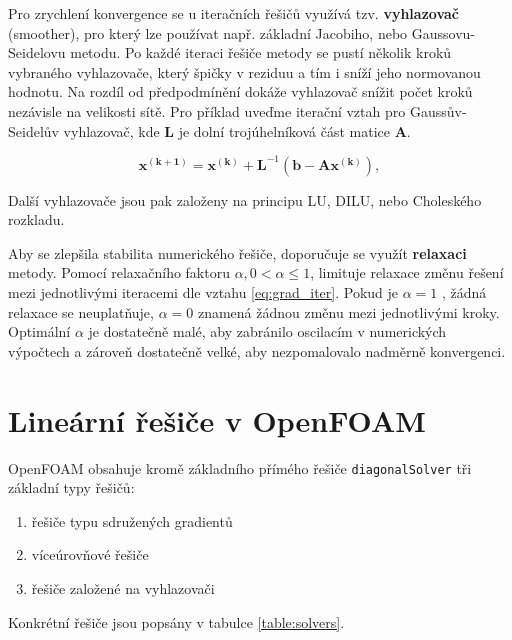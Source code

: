 \documentclass[a4paper,12pt]{report}
\theoremstyle{remark}
\begin{document}
	Pro zrychlení konvergence se u iteračních řešičů využívá tzv. \textbf{vyhlazovač} (smoother), pro který lze používat např. základní Jacobiho, nebo Gaussovu-Seidelovu metodu. Po každé iteraci řešiče metody se pustí několik kroků vybraného vyhlazovače, který  špičky v reziduu a tím i sníží jeho normovanou hodnotu. Na rozdíl od předpodmínění dokáže vyhlazovač snížit počet kroků nezávisle na velikosti sítě. Pro příklad uveďme iterační vztah pro Gaussův-Seidelův vyhlazovač, kde $\boldsymbol{L}$ je dolní trojúhelníková část matice $\boldsymbol{A}$.
	
	\begin{equation}
		\boldsymbol{x^{(k+1)}} = \boldsymbol{x^{(k)}}+\boldsymbol{L}^{-1}(\boldsymbol{b} -  \boldsymbol{A}\boldsymbol{x^{(k)}}),
		\label{eq:gs_smoother}
	\end{equation}

Další vyhlazovače jsou pak založeny na principu LU, DILU, nebo Choleského rozkladu.
	
	Aby se zlepšila stabilita numerického řešiče, doporučuje se využít \textbf{relaxaci} metody. Pomocí relaxačního faktoru $\alpha, 0 < \alpha \leq 1 $, limituje relaxace změnu řešení mezi jednotlivými iteracemi dle vztahu \eqref{eq:grad_iter}. Pokud je   $\alpha = 1$ , žádná relaxace se neuplatňuje, $\alpha = 0$ znamená žádnou změnu mezi jednotlivými kroky.   Optimální $\alpha$ je dostatečně malé, aby zabránilo oscilacím v numerických výpočtech a zároveň dostatečně velké, aby nezpomalovalo nadměrně konvergenci. 
	
	{\let\clearpage\relax \chapter{Lineární řešiče v OpenFOAM}}

OpenFOAM obsahuje kromě základního přímého řešiče \texttt{diagonalSolver} tři základní typy řešičů:
\begin{enumerate}
	\item řešiče typu sdružených gradientů 
	\item víceúrovňové řešiče
	\item řešiče založené na vyhlazovači

\end{enumerate}

Konkrétní řešiče jsou popsány v tabulce \ref{table:solvers}.
\end{document}
